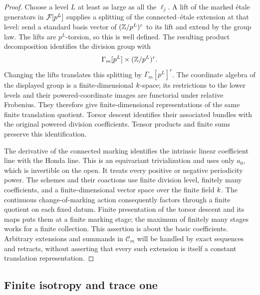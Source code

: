 \begin{proof}
Choose a level $L$ at least as large as all the $\ell_j$.  A lift
of the marked \'{e}tale generators in $\mathcal F[p^L]$ supplies a splitting
of the connected--\'{e}tale extension at that level: send a standard
basis vector of $(\mathbb Z/p^L)^r$ to its lift and extend by the group
law.  The lifts are $p^L$-torsion, so this is well defined.  The
resulting product decomposition identifies the division group with
\[
 \Gamma_m[p^L]\times(\mathbb Z/p^L)^r.
\]
Changing the lifts translates this splitting by
$\Gamma_m[p^L]^r$.  The coordinate algebra of the displayed group
is a finite-dimensional $k$-space; its restrictions to the lower
levels and their powered-coordinate images are functorial under
relative Frobenius.  They therefore give finite-dimensional
representations of the same finite translation quotient.  Torsor
descent identifies their associated bundles with the original
powered division coefficients.  Tensor products and finite sums
preserve this identification.

The derivative of the connected marking identifies the intrinsic
linear coefficient line with the Honda line.  This is an
equivariant trivialization and uses only $a_0$, which is invertible
on the open.  It treats every positive or negative periodicity
power.  The schemes and their coactions use finite division level,
finitely many coefficients, and a finite-dimensional vector space
over the finite field $k$.  The continuous change-of-marking
action consequently factors through a finite quotient on each
fixed datum.  Finite presentation of the torsor descent and its
maps puts them at a finite marking stage; the maximum of finitely
many stages works for a finite collection.  This assertion is about
the basic coefficients.  Arbitrary extensions and summands in
$\mathscr C_m$ will be handled by exact sequences and retracts,
without asserting that every such extension is itself a constant
translation representation.
\end{proof}

\subsection{Finite isotropy and trace one}


